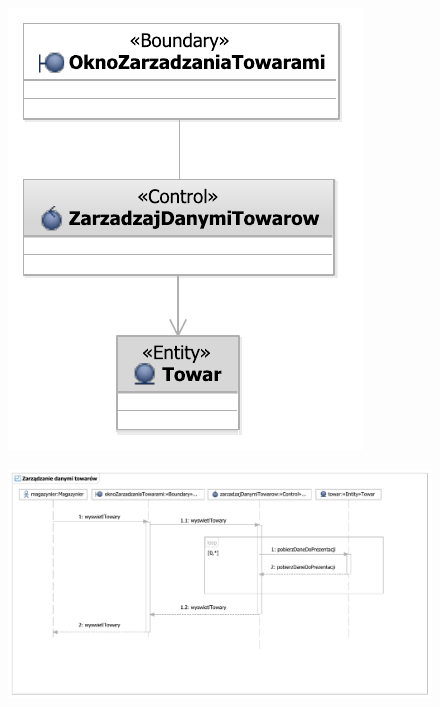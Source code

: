 \begin{figure}[H]
  \centering
  \includegraphics[angle=\ecbangle, scale=\ecbscale]{../img/usecase/pu18ecb.pdf}
  \caption{}
\end{figure}
\newpage
\begin{figure}[H]
  \centering
  \includegraphics[angle=\seqangle, scale=\seqscale]{../img/usecase/pu18seq.pdf}
  \caption{}
\end{figure}
\newpage

